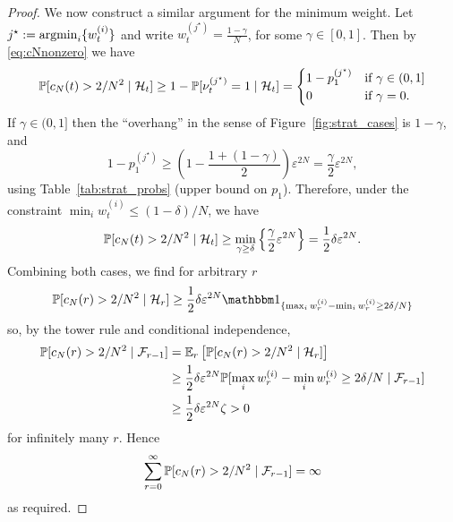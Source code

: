 \begin{proof}
We now construct a similar argument for the minimum weight. Let $j^\star := \operatorname*{argmin}_i \{ w_t^{(i)} \}$ and write
$w_t^{(j^\star)} = \frac{1-\gamma}{N}$, for some $\gamma \in [0,1]$.
Then by \eqref{eq:cNnonzero} we have
\begin{equation*}
\mathbb{P}[ c_N(t) > 2/N^2 \mid \mathcal{H}_t ]
\geq 1- \mathbb{P}[ \nu_t^{(j^\star)} =1 \mid \mathcal{H}_t ]
=\begin{cases}
    1- p_1^{(j^\star)} & \text{if } \gamma \in (0,1] \\
    0 & \text{if } \gamma =0 .
\end{cases}
\end{equation*}
If $\gamma \in (0,1]$ then the ``overhang'' in the sense of Figure~\ref{fig:strat_cases} is $1-\gamma$, and
\begin{equation*}
1- p_1^{(j^\star)}
\geq \left( 1- \frac{1+ (1-\gamma)}{2} \right) \varepsilon^{2N}
= \frac{ \gamma }{2} \varepsilon^{2N} ,
\end{equation*}
using Table~\ref{tab:strat_probs} (upper bound on $p_1$).
Therefore, under the constraint $\min_i w_t^{(i)} \leq (1-\delta)/N$, we have
\begin{equation*}
\mathbb{P}[ c_N(t) > 2/N^2 \mid \mathcal{H}_t ]
\geq \min_{\gamma \geq \delta} 
        \left\{ \frac{ \gamma }{2} \varepsilon^{2N}
        \right\}
= \frac{1}{2} \delta \varepsilon^{2N} .
\end{equation*}
Combining both cases, we find for arbitrary $r$
\begin{equation*}
\Prob[ c_N(r) > 2/N^2 \mid \mathcal{H}_r ] 
\geq  \frac{1}{2} \delta \varepsilon^{2N} 
        \I{ \max_i w_r^{(i)} - \min_i w_r^{(i)} \geq 2\delta/N }
\end{equation*}
so, by the tower rule and conditional independence,
\begin{align*}
\mathbb{P}[ c_N(r) > 2/N^2 \mid \mathcal{F}_{r-1} ] 
&= \mathbb{E}_r \left[ \mathbb{P}[ c_N(r) > 2/N^2 \mid \mathcal{H}_r ] \right] \\
&\geq  \frac{1}{2} \delta \varepsilon^{2N} 
        \mathbb{P}[ \max_i w_r^{(i)} - \min_i w_r^{(i)} \geq 2\delta/N 
        \mid \mathcal{F}_{r-1} ] \\
&\geq \frac{1}{2} \delta \varepsilon^{2N} \zeta
> 0
\end{align*}
for infinitely many $r$.
Hence
\begin{equation*}
\sum_{r=0}^\infty \mathbb{P}[ c_N(r) > 2/N^2  \mid \mathcal{F}_{r-1} ] = \infty
\end{equation*}
as required.
\end{proof}



